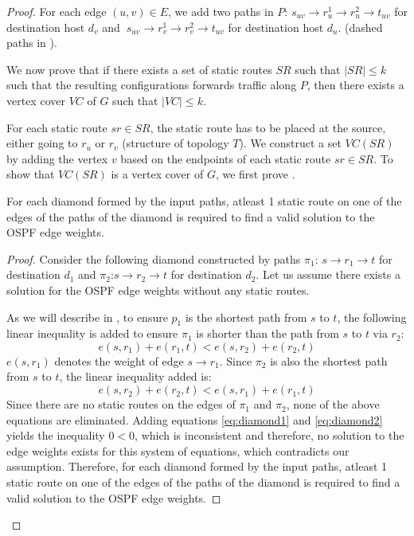 \begin{proof}
For each edge $(u,v) \in E$, we add two paths in $P$: 
$s_{uv} \rightarrow r_u^1 \rightarrow r_u^2 \rightarrow t_{uv}$
for destination host $d_v$ and 
$~s_{uv} \rightarrow r_v^1 \rightarrow r_v^2 \rightarrow t_{uv}$ 
for destination host $d_u$.
(dashed paths in ). 

We now prove that if there exists a set of static routes
$SR$ such that $|SR| \leq k$ such that the resulting configurations
forwards traffic along $P$, then there exists a vertex cover $VC$
of $G$ such that $|VC| \leq k$. 

For each static route $sr \in SR$, the static route
has to be placed at the source, either going to $r_u$
or $r_v$ (structure of topology $T$). 
We construct a set $VC(SR)$ by adding the vertex $v$ 
based on the endpoints of each static route $sr \in SR$.
To show that $VC(SR)$ is a vertex cover of $G$, we first
prove .

\begin{lemma} \label{lemma:diamond}
	 For each diamond formed by the input paths, atleast 1 
	 static route on one of the edges of the paths of the diamond 
	 is required to find a valid solution to the
	 OSPF edge weights.  
\end{lemma}

\begin{proof}
Consider the following diamond %
constructed by paths $\pi_1$: $s \rightarrow r_1 \rightarrow t$ 
for destination $d_1$ and $\pi_2$:$s \rightarrow r_2 \rightarrow t$ 
for destination $d_2$. Let us assume there exists a solution 
for the OSPF edge weights without any static routes. 

As we will describe in , 
to ensure $p_1$ is the shortest path from $s$ to $t$, the following
linear inequality is added to ensure $\pi_1$ is shorter than the
path from $s$ to $t$ via $r_2$: 
\begin{equation} \label{eq:diamond1}
	e(s,r_1) + e(r_1, t) < e(s, r_2) + e(r_2,t)
\end{equation}
$e(s,r_1)$ denotes the weight of edge $s \rightarrow r_1$.
Since $\pi_2$ is also the shortest path from $s$ 
to $t$, the linear inequality added is:
\begin{equation}  \label{eq:diamond2}
e(s,r_2) + e(r_2, t) < e(s, r_1) + e(r_1,t)
\end{equation}
Since there are no static routes on the edges
of $\pi_1$ and $\pi_2$, none of the above equations are 
eliminated. 
Adding equations \ref{eq:diamond1} and  \ref{eq:diamond2} 
yields the inequality $0 < 0$, which is inconsistent 
and therefore, no solution to 
the edge weights exists for this system of equations, 
which contradicts our assumption. Therefore,
for each diamond formed by the input paths, atleast 1 
static route on one of the edges of the paths of the diamond 
is required to find a valid solution to the
OSPF edge weights.  
\end{proof}


\end{proof}
